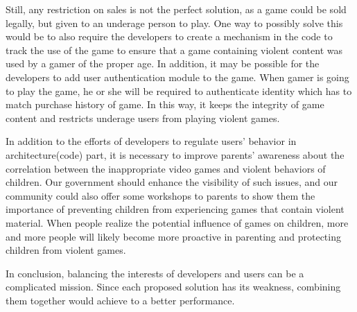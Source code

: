 Still, any restriction on sales is not the perfect solution, as a game could be sold legally, but given to an underage person to play. One way to possibly solve this would be to also require the developers to create a mechanism in the code to track the use of the game to ensure that a game containing violent content was used by a gamer of the proper age. In addition, it may be possible for the developers to add user authentication module to the game. When gamer is going to play the game, he or she will be required to authenticate identity which has to match purchase history of game. In this way, it keeps the integrity of game content and restricts underage users from playing violent games.

In addition to the efforts of developers to regulate users' behavior in architecture(code) part, it is necessary to improve parents' awareness about the correlation between the inappropriate video games and violent behaviors of children. Our government should enhance the visibility of such issues, and our community could also offer some workshops to parents to show them the importance of preventing children from experiencing games that contain violent material. When people realize the potential influence of games on children, more and more people will likely become more proactive in parenting and protecting children from violent games.

In conclusion, balancing the interests of developers and users can be a complicated mission. Since each proposed solution has its weakness, combining them together would achieve to a better performance. 

